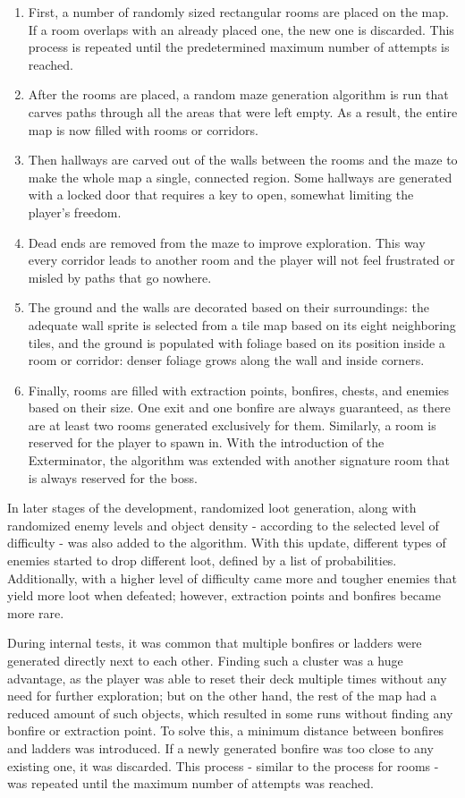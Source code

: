 \begin{enumerate}
  \item First, a number of randomly sized rectangular rooms are placed on the map. If a room overlaps with an already placed one, the new one is discarded. This process is repeated until the predetermined maximum number of attempts is reached.
  \item After the rooms are placed, a random maze generation algorithm is run that carves paths through all the areas that were left empty. As a result, the entire map is now filled with rooms or corridors.
  \item Then hallways are carved out of the walls between the rooms and the maze to make the whole map a single, connected region. Some hallways are generated with a locked door that requires a key to open, somewhat limiting the player's freedom.
  \item Dead ends are removed from the maze to improve exploration. This way every corridor leads to another room and the player will not feel frustrated or misled by paths that go nowhere.
  \item The ground and the walls are decorated based on their surroundings: the adequate wall sprite is selected from a tile map based on its eight neighboring tiles, and the ground is populated with foliage based on its position inside a room or corridor: denser foliage grows along the wall and inside corners.
  \item Finally, rooms are filled with extraction points, bonfires, chests, and enemies based on their size. One exit and one bonfire are always guaranteed, as there are at least two rooms generated exclusively for them. Similarly, a room is reserved for the player to spawn in. With the introduction of the Exterminator, the algorithm was extended with another signature room that is always reserved for the boss.
\end{enumerate}

In later stages of the development, randomized loot generation, along with randomized enemy levels and object density - according to the selected level of difficulty - was also added to the algorithm. With this update, different types of enemies started to drop different loot, defined by a list of probabilities. Additionally, with a higher level of difficulty came more and tougher enemies that yield more loot when defeated; however, extraction points and bonfires became more rare.

During internal tests, it was common that multiple bonfires or ladders were generated directly next to each other. Finding such a cluster was a huge advantage, as the player was able to reset their deck multiple times without any need for further exploration; but on the other hand, the rest of the map had a reduced amount of such objects, which resulted in some runs without finding any bonfire or extraction point. To solve this, a minimum distance between bonfires and ladders was introduced. If a newly generated bonfire was too close to any existing one, it was discarded. This process - similar to the process for rooms - was repeated until the maximum number of attempts was reached.

